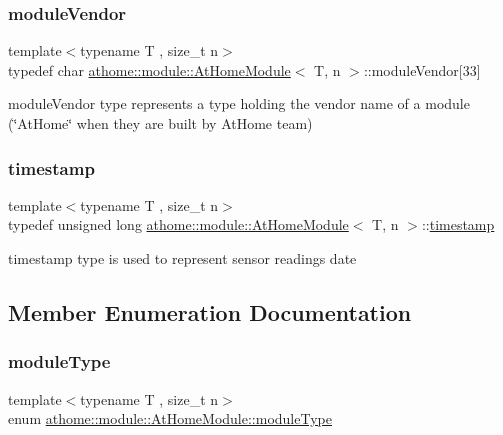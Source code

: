 \subsubsection{\texorpdfstring{module\+Vendor}{moduleVendor}}
{\footnotesize\ttfamily template$<$typename T , size\+\_\+t n$>$ \\
typedef char \mbox{\hyperlink{classathome_1_1module_1_1_at_home_module}{athome\+::module\+::\+At\+Home\+Module}}$<$ T, n $>$\+::module\+Vendor\mbox{[}33\mbox{]}}

{\ttfamily module\+Vendor} type represents a type holding the vendor name of a module (\char`\"{}\+At\+Home\char`\"{} when they are built by At\+Home team) \mbox{\label{classathome_1_1module_1_1_at_home_module_a661e1d39798077c49497844af658dc5d}} 
\subsubsection{\texorpdfstring{timestamp}{timestamp}}
{\footnotesize\ttfamily template$<$typename T , size\+\_\+t n$>$ \\
typedef unsigned long \mbox{\hyperlink{classathome_1_1module_1_1_at_home_module}{athome\+::module\+::\+At\+Home\+Module}}$<$ T, n $>$\+::\mbox{\hyperlink{classathome_1_1module_1_1_at_home_module_a661e1d39798077c49497844af658dc5d}{timestamp}}}

{\ttfamily timestamp} type is used to represent sensor readings date 

\subsection{Member Enumeration Documentation}
\mbox{\label{classathome_1_1module_1_1_at_home_module_a5075522baeaab0de681c26a5e5f18cd3}} 
\subsubsection{\texorpdfstring{module\+Type}{moduleType}}
{\footnotesize\ttfamily template$<$typename T , size\+\_\+t n$>$ \\
enum \mbox{\hyperlink{classathome_1_1module_1_1_at_home_module_a5075522baeaab0de681c26a5e5f18cd3}{athome\+::module\+::\+At\+Home\+Module\+::module\+Type}}}

